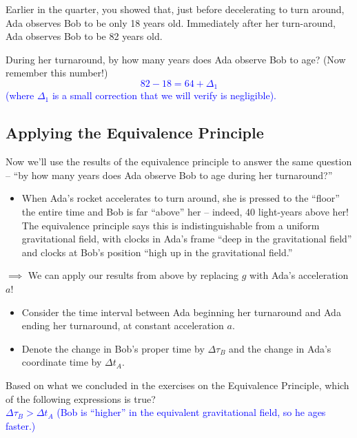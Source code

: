 \documentclass[11pt, letterpaper, openany]{book}
\newenvironment{exercise}[1][Exercise]{%
  \tcolorbox[blanker, breakable, left=1em,
    before skip=1em, after skip=1em,
    borderline west={3pt}{0pt}{PhysNavy},
    colback=PhysCream,
    before upper={\textcolor{PhysNavy}{\sffamily\bfseries #1:}\space}
  ]%
}{%
  \endtcolorbox%
}
\begin{document}
Earlier in the quarter, you showed that, just before decelerating to turn around, Ada observes Bob to be only 18 years old. Immediately after her turn-around, Ada observes Bob to be 82 years old.

\begin{exercise}[Exercise 13]
During her turnaround, by how many years does Ada observe Bob to age? (Now remember this number!) \\
\textcolor{blue}{
\[ 82 - 18 = 64 + \Delta_1 \]
(where $\Delta_1$ is a small correction that we will verify is negligible).
}
\end{exercise}

\subsection*{Applying the Equivalence Principle}

Now we'll use the results of the equivalence principle to answer the same question -- ``by how many years does Ada observe Bob to age during her turnaround?''

\begin{itemize}
    \item When Ada's rocket accelerates to turn around, she is pressed to the ``floor'' the entire time and Bob is far ``above'' her -- indeed, 40 light-years above her! The equivalence principle says this is indistinguishable from a uniform gravitational field, with clocks in Ada's frame ``deep in the gravitational field'' and clocks at Bob's position ``high up in the gravitational field.''
\end{itemize}

$\implies$ We can apply our results from above by replacing $g$ with Ada's acceleration $a$!

\begin{itemize}
    \item Consider the time interval between Ada beginning her turnaround and Ada ending her turnaround, at constant acceleration $a$.
    \item Denote the change in Bob's proper time by $\Delta\tau_B$ and the change in Ada's coordinate time by $\Delta t_A$.
\end{itemize}

\begin{exercise}[Exercise 14]
Based on what we concluded in the exercises on the Equivalence Principle, which of the following expressions is true? \\
\textcolor{blue}{$\Delta\tau_B > \Delta t_A$ \quad (Bob is ``higher'' in the equivalent gravitational field, so he ages faster.)}
\end{exercise}
\end{document}
